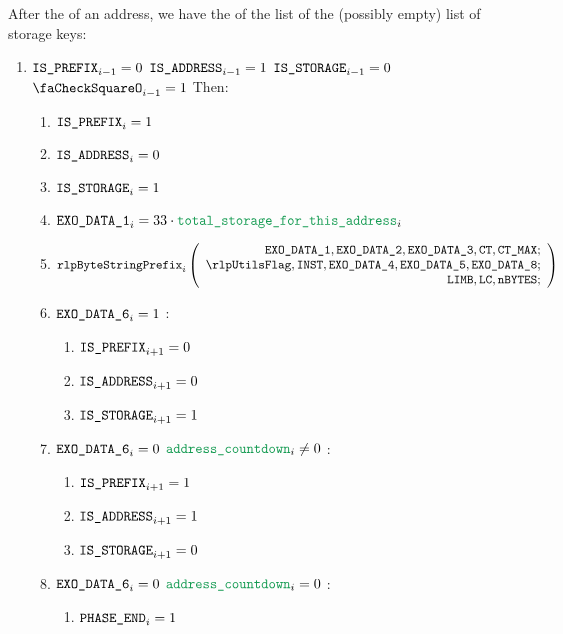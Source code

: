 \begin{enumerate}[resume]
		After the \rlp{} of an address, we have the \rlp{} of the list of the (possibly empty) list of storage keys:
		\begin{enumerate}[resume]
			\item \If $\texttt{IS\_PREFIX} _{i - 1} = 0$ \et $\texttt{IS\_ADDRESS} _{i - 1} = 1$ \et $\texttt{IS\_STORAGE} _{i - 1} = 0$ \et $\done _{i - 1} =1$ Then:
				\begin{enumerate}
					\item $\texttt{IS\_PREFIX} _{i} = 1$
					\item $\texttt{IS\_ADDRESS}   _{i} = 0$
					\item $\texttt{IS\_STORAGE}    _{i} = 1$
					\item $\exoDataColumn{1} _{i} = 33 \cdot \locTotStorageForThisAddress _{i}$
					\item
						\[
							\rlpBytestringPrefix _{i}
							\left(
							\begin{array}{r}
								\exoDataColumn{1},
								\exoDataColumn{2},
								\exoDataColumn{3},
								\ct,
								\maxCt; \\
								\rlpUtilsFlag,
								\INST,
								\exoDataColumn{4},
								\exoDataColumn{5},
								\exoDataColumn{8}; \\
								\limb,
								\lc,
								\limbsize; \\
							\end{array}
							\right)
						\]

					\item \If $\texttt{EXO\_DATA\_6} _{i} = 1$ \Then:
						\begin{enumerate}
							\item $\texttt{IS\_PREFIX} _{i + 1} = 0$
							\item $\texttt{IS\_ADDRESS}   _{i + 1} = 0$
							\item $\texttt{IS\_STORAGE}    _{i + 1} = 1$
						\end{enumerate}

					\item \If $\texttt{EXO\_DATA\_6} _{i} = 0$ \et $\locAddressPrewarmingCountdown _{i} \neq 0$ \Then:
						\begin{enumerate}
							\item $\texttt{IS\_PREFIX} _{i + 1} = 1$
							\item $\texttt{IS\_ADDRESS}   _{i + 1} = 1$
							\item $\texttt{IS\_STORAGE}    _{i + 1} = 0$
						\end{enumerate}

					\item \If $\texttt{EXO\_DATA\_6} _{i} = 0$ \et $\locAddressPrewarmingCountdown _{i} = 0$ \Then:
						\begin{enumerate}
							\item $\texttt{PHASE\_END} _{i} = 1$
						\end{enumerate}
				\end{enumerate}
		\end{enumerate}


\end{enumerate}
